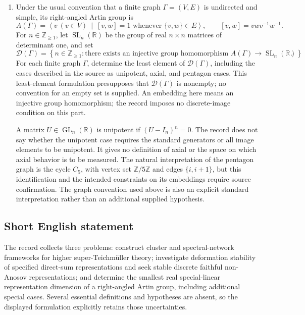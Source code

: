 \documentclass[11pt]{article}
\newcommand{\Z}{\mathbb{Z}}
\newcommand{\R}{\mathbb{R}}
\begin{document}
\begin{enumerate}
The record does not identify \(H\), the two representations, their dimensions, or the embeddings and invariant forms that place their direct sum in the displayed groups. It also does not specify whether the assertion concerns every such pair or a particular pair. A possible meaning of stability here is that the representation lies in the interior of the discrete faithful locus in \(\operatorname{Hom}(H,G)\), with the topology of pointwise convergence; this interpretation is not fixed by the supplied record. The relevant meaning of Anosov, including the parabolic subgroup or family of parabolic subgroups, is likewise unspecified. These missing data prevent an unconditional, fully quantified formulation of this part.

\item Under the usual convention that a finite graph \(\Gamma=(V,E)\) is undirected and simple, its right-angled Artin group is
\[
A(\Gamma)=\left\langle v\ (v\in V)\ \middle|\ [v,w]=1\text{ whenever }\{v,w\}\in E\right\rangle,
\qquad [v,w]=vwv^{-1}w^{-1}.
\]
For \(n\in\Z_{\geq 1}\), let \(\operatorname{SL}_n(\R)\) be the group of real \(n\times n\) matrices of determinant one, and set
\[
\mathcal D(\Gamma)=\left\{n\in\Z_{\geq 1}:\text{there exists an injective group homomorphism }A(\Gamma)\longrightarrow\operatorname{SL}_n(\R)\right\}.
\]
For each finite graph \(\Gamma\), determine the least element of \(\mathcal D(\Gamma)\), including the cases described in the source as unipotent, axial, and pentagon cases. This least-element formulation presupposes that \(\mathcal D(\Gamma)\) is nonempty; no convention for an empty set is supplied. An embedding here means an injective group homomorphism; the record imposes no discrete-image condition on this part.

A matrix \(U\in\operatorname{GL}_n(\R)\) is unipotent if \((U-I_n)^n=0\). The record does not say whether the unipotent case requires the standard generators or all image elements to be unipotent. It gives no definition of axial or the space on which axial behavior is to be measured. The natural interpretation of the pentagon graph is the cycle \(C_5\), with vertex set \(\Z/5\Z\) and edges \(\{i,i+1\}\), but this identification and the intended constraints on its embeddings require source confirmation. The graph convention used above is also an explicit standard interpretation rather than an additional supplied hypothesis.
\end{enumerate}
\subsection{Short English statement}
The record collects three problems: construct cluster and spectral-network frameworks for higher super-Teichmüller theory; investigate deformation stability of specified direct-sum representations and seek stable discrete faithful non-Anosov representations; and determine the smallest real special-linear representation dimension of a right-angled Artin group, including additional special cases. Several essential definitions and hypotheses are absent, so the displayed formulation explicitly retains those uncertainties.
\end{document}
